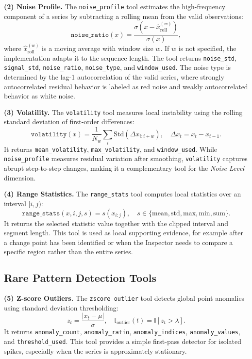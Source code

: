 \documentclass{article}
\begin{document}
\textbf{(2) Noise Profile.}
The \texttt{noise\_profile} tool estimates the high-frequency component of a series by subtracting a rolling mean from the valid observations:
\begin{equation}
\texttt{noise\_ratio}(x) = 
\frac{\sigma(x - \hat{x}_{\mathrm{roll}}^{(w)})}{\sigma(x)},
\end{equation}
where $\hat{x}_{\mathrm{roll}}^{(w)}$ is a moving average with window size $w$. If $w$ is not specified, the implementation adapts it to the sequence length. The tool returns \texttt{noise\_std}, \texttt{signal\_std}, \texttt{noise\_ratio}, \texttt{noise\_type}, and \texttt{window\_used}. The noise type is determined by the lag-1 autocorrelation of the valid series, where strongly autocorrelated residual behavior is labeled as red noise and weakly autocorrelated behavior as white noise.

\textbf{(3) Volatility.}
The \texttt{volatility} tool measures local instability using the rolling standard deviation of first-order differences:
\begin{equation}
\texttt{volatility}(x) =
\frac{1}{N_w}\sum_i \mathrm{Std}\left(\Delta x_{i:i+w}\right),
\quad \Delta x_t = x_t - x_{t-1}.
\end{equation}
It returns \texttt{mean\_volatility}, \texttt{max\_volatility}, and \texttt{window\_used}. While \texttt{noise\_profile} measures residual variation after smoothing, \texttt{volatility} captures abrupt step-to-step changes, making it a complementary tool for the \textit{Noise Level} dimension.

\textbf{(4) Range Statistics.}
The \texttt{range\_stats} tool computes local statistics over an interval $[i,j)$:
\begin{equation}
\texttt{range\_stats}(x, i, j, s) = s(x_{i:j}),
\quad s \in \{\mathrm{mean}, \mathrm{std}, \mathrm{max}, \mathrm{min}, \mathrm{sum}\}.
\end{equation}
It returns the selected statistic value together with the clipped interval and segment length. This tool is used as local supporting evidence, for example after a change point has been identified or when the Inspector needs to compare a specific region rather than the entire series.

\subsection{Rare Pattern Detection Tools}

\textbf{(5) Z-score Outliers.}
The \texttt{zscore\_outlier} tool detects global point anomalies using standard deviation thresholding:
\begin{equation}
z_t = \frac{|x_t - \mu|}{\sigma}, \quad
\mathbb{I}_{\mathrm{outlier}}(t)=\mathbb{I}[z_t > \lambda].
\end{equation}
It returns \texttt{anomaly\_count}, \texttt{anomaly\_ratio}, \texttt{anomaly\_indices}, \texttt{anomaly\_values}, and \texttt{threshold\_used}. This tool provides a simple first-pass detector for isolated spikes, especially when the series is approximately stationary.
\end{document}
